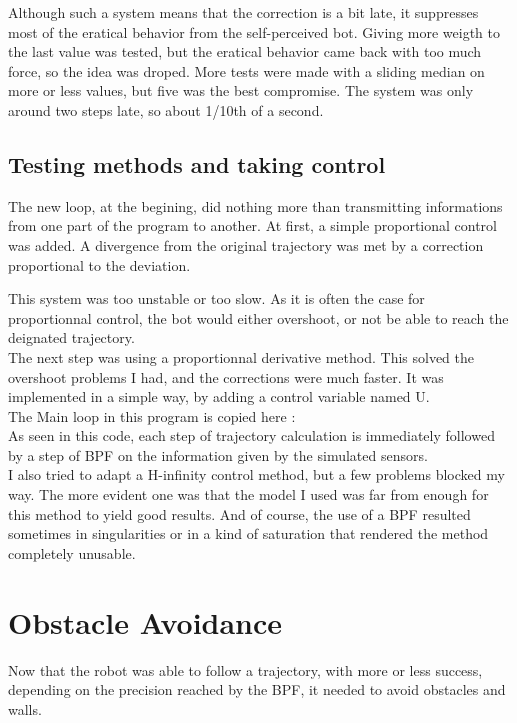 Although such a system means that the correction is a bit late, it suppresses most of the eratical behavior from the self-perceived bot.
Giving more weigth to the last value was tested, but the eratical behavior came back with too much force, so the idea was droped.
More tests were made with a sliding median on more or less values, but five was the best compromise.
The system was only around two steps late, so about 1/10th of a second.

\subsection{Testing methods and taking control}

The new loop, at the begining, did nothing more than transmitting informations from one part of the program to another.
At first, a simple proportional control was added. A divergence from the original trajectory was met by a correction proportional to the deviation.

This system was too unstable or too slow.
As it is often the case for proportionnal control, the bot would either overshoot, or not be able to reach the deignated trajectory.\\

The next step was using a proportionnal derivative method. This solved the overshoot problems I had, and the corrections were much faster.
It was implemented in a simple way, by adding a control variable named U.\\

The Main loop in this program is copied here :\\



As seen in this code, each step of trajectory calculation is immediately followed by a step of BPF on the information given by the simulated sensors. \\



I also tried to adapt a H-infinity control method, but a few problems blocked my way.
The more evident one was that the model I used was far from enough for this method to yield good results.
And of course, the use of a BPF resulted sometimes in singularities or in a kind of saturation that rendered the method completely unusable.


\section{Obstacle Avoidance}
Now that the robot was able to follow a trajectory, with more or less success, depending on the precision reached by the BPF, it needed to avoid obstacles and walls.


